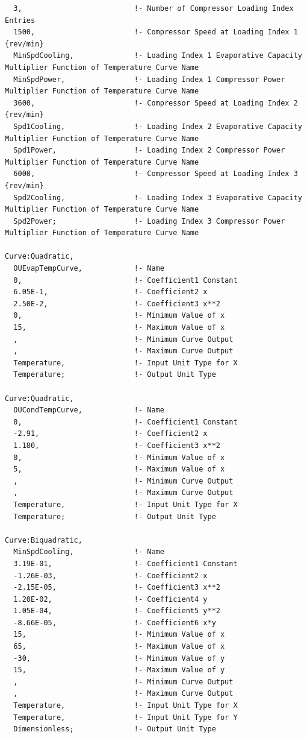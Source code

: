 \begin{lstlisting}
  3,                          !- Number of Compressor Loading Index Entries
  1500,                       !- Compressor Speed at Loading Index 1 {rev/min}
  MinSpdCooling,              !- Loading Index 1 Evaporative Capacity Multiplier Function of Temperature Curve Name
  MinSpdPower,                !- Loading Index 1 Compressor Power Multiplier Function of Temperature Curve Name
  3600,                       !- Compressor Speed at Loading Index 2 {rev/min}
  Spd1Cooling,                !- Loading Index 2 Evaporative Capacity Multiplier Function of Temperature Curve Name
  Spd1Power,                  !- Loading Index 2 Compressor Power Multiplier Function of Temperature Curve Name
  6000,                       !- Compressor Speed at Loading Index 3 {rev/min}
  Spd2Cooling,                !- Loading Index 3 Evaporative Capacity Multiplier Function of Temperature Curve Name
  Spd2Power;                  !- Loading Index 3 Compressor Power Multiplier Function of Temperature Curve Name

Curve:Quadratic,
  OUEvapTempCurve,            !- Name
  0,                          !- Coefficient1 Constant
  6.05E-1,                    !- Coefficient2 x
  2.50E-2,                    !- Coefficient3 x**2
  0,                          !- Minimum Value of x
  15,                         !- Maximum Value of x
  ,                           !- Minimum Curve Output
  ,                           !- Maximum Curve Output
  Temperature,                !- Input Unit Type for X
  Temperature;                !- Output Unit Type

Curve:Quadratic,
  OUCondTempCurve,            !- Name
  0,                          !- Coefficient1 Constant
  -2.91,                      !- Coefficient2 x
  1.180,                      !- Coefficient3 x**2
  0,                          !- Minimum Value of x
  5,                          !- Maximum Value of x
  ,                           !- Minimum Curve Output
  ,                           !- Maximum Curve Output
  Temperature,                !- Input Unit Type for X
  Temperature;                !- Output Unit Type

Curve:Biquadratic,
  MinSpdCooling,              !- Name
  3.19E-01,                   !- Coefficient1 Constant
  -1.26E-03,                  !- Coefficient2 x
  -2.15E-05,                  !- Coefficient3 x**2
  1.20E-02,                   !- Coefficient4 y
  1.05E-04,                   !- Coefficient5 y**2
  -8.66E-05,                  !- Coefficient6 x*y
  15,                         !- Minimum Value of x
  65,                         !- Maximum Value of x
  -30,                        !- Minimum Value of y
  15,                         !- Maximum Value of y
  ,                           !- Minimum Curve Output
  ,                           !- Maximum Curve Output
  Temperature,                !- Input Unit Type for X
  Temperature,                !- Input Unit Type for Y
  Dimensionless;              !- Output Unit Type


\end{lstlisting}

